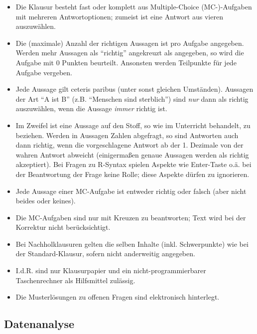\documentclass[12pt,ngerman,]{book}
\begin{document}
\begin{itemize}
\item
  Die Klausur besteht fast oder komplett aus Multiple-Choice
  (MC-)-Aufgaben mit mehreren Antwortoptionen; zumeist ist eine Antwort
  aus vieren auszuwählen.
\item
  Die (maximale) Anzahl der richtigen Aussagen ist pro Aufgabe
  angegeben. Werden mehr Aussagen als ``richtig'' angekreuzt als
  angegeben, so wird die Aufgabe mit 0 Punkten beurteilt. Ansonsten
  werden Teilpunkte für jede Aufgabe vergeben.
\item
  Jede Aussage gilt ceteris paribus (unter sonst gleichen Umständen).
  Aussagen der Art ``A ist B'' (z.B. ``Menschen sind sterblich'') sind
  \emph{nur} dann als richtig auszuwählen, wenn die Aussage \emph{immer}
  richtig ist.
\item
  Im Zweifel ist eine Aussage auf den Stoff, so wie im Unterricht
  behandelt, zu beziehen. Werden in Aussagen Zahlen abgefragt, so sind
  Antworten auch dann richtig, wenn die vorgeschlagene Antwort ab der 1.
  Dezimale von der wahren Antwort abweicht (einigermaßen genaue Aussagen
  werden als richtig akzeptiert). Bei Fragen zu R-Syntax spielen Aspekte
  wie Enter-Taste o.ä. bei der Beantwortung der Frage keine Rolle; diese
  Aspekte dürfen zu ignorieren.
\item
  Jede Aussage einer MC-Aufgabe ist entweder richtig oder falsch (aber
  nicht beides oder keines).
\item
  Die MC-Aufgaben sind nur mit Kreuzen zu beantworten; Text wird bei der
  Korrektur nicht berücksichtigt.
\item
  Bei Nachholklausuren gelten die selben Inhalte (inkl. Schwerpunkte)
  wie bei der Standard-Klausur, sofern nicht anderweitig angegeben.
\item
  I.d.R. sind nur Klausurpapier und ein nicht-programmierbarer
  Taschenrechner als Hilfsmittel zulässig.
\item
  Die Musterlösungen zu offenen Fragen sind elektronisch hinterlegt.
\end{itemize}

\subsection{Datenanalyse}\label{datenanalyse}
\end{document}
